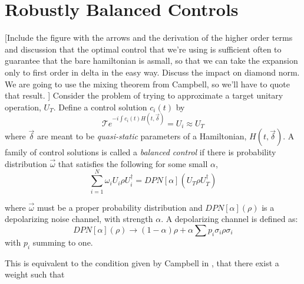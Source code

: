\documentclass[aps,nofootinbib,pra,notitlepage,twocolumn]{revtex4-1}
\newcommand{\note}[1]{{\color{red}[#1]}}
\begin{document}
\section{Robustly Balanced Controls}
\note{Include the figure with the arrows and the derivation of the higher order terms and discussion that the optimal control that we're using is sufficient often to guarantee that the bare hamiltonian is asmall, so that we can take the expansion only to first order in delta in the easy way. Discuss the impact on diamond norm. We are going to use the mixing theorem from Campbell, so we'll have to quote that result. }
 Consider the problem of trying to approximate a target unitary operation, $U_T$. Define a control solution $c_i(t)$ by  \begin{equation}
\mathcal{T}e^{-i\int c_i(t)H(t, \vec{\delta})} = U_i \approx U_T
 \end{equation}
 where $\vec{\delta}$ are meant to be \textit{quasi-static}\cite{Ball2016} parameters of a Hamiltonian, $H(t, \vec{\delta})$. A family of control solutions is called a \emph{balanced control} if there is probability distribution $\vec{\omega}$ that satisfies the following for some small $\alpha$,
\begin{equation}\label{eq:1}
  \sum_{i=1}^N \omega_i U_i \rho U_i^\dagger = DPN[\alpha]\left(U_T \rho U_T^\dagger \right)
\end{equation}

where $\vec{\omega}$ must be a proper probability distribution and $DPN[\alpha](\rho)$ is a depolarizing noise channel, with strength $\alpha$. A depolarizing channel is defined as:
\begin{equation}\label{eq:2}
  DPN[\alpha](\rho) \rightarrow (1-\alpha)\rho + \alpha\sum p_i \sigma_i\rho\sigma_i
\end{equation}
with $p_i$ summing to one.

This is equivalent to the condition given by Campbell in \cite{Campbell2017}, that there exist a weight such that
\end{document}
